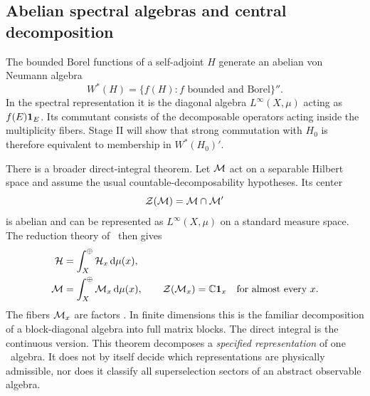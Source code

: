 \subsection{Abelian spectral algebras and central decomposition}
\label{subsec:central-decomposition}

The bounded Borel functions of a self-adjoint $H$ generate an abelian von
Neumann algebra
\begin{equation}
  W^*(H)=\{f(H):\text{$f$ bounded and Borel}\}'' .
  \label{eq:von-neumann-generated-H}
\end{equation}
In the spectral representation it is the diagonal algebra
$L^\infty(X,\mu)$ acting as $f(E)\mathbf{1}_E$.  Its commutant consists
of the decomposable operators acting inside the multiplicity fibers.  Stage II
will show that strong commutation with $H_0$ is therefore equivalent to
membership in $W^*(H_0)'$.

There is a broader direct-integral theorem.  Let $\mathcal{M}$ act on a separable
Hilbert space and assume the usual countable-decomposability hypotheses.  Its
center
\begin{equation}
  \mathcal{Z}(\mathcal{M})=\mathcal{M}\cap\mathcal{M}'
  \label{eq:center-von-neumann}
\end{equation}
is abelian and can be represented as $L^\infty(X,\mu)$ on a standard
measure space.  The reduction theory of \vN\ then gives
\begin{align}
  \mathcal{H}&=\int_X^\oplus\mathcal{H}_x\,\mathrm{d}\mu(x),
  \label{eq:central-H-decomposition}\\
  \mathcal{M}&=\int_X^\oplus\mathcal{M}_x\,\mathrm{d}\mu(x),
  \qquad
  \mathcal{Z}(\mathcal{M}_x)=\mathbb{C}\mathbf{1}_x
  \quad\text{for almost every $x$} .
  \label{eq:central-algebra-decomposition}
\end{align}
The fibers $\mathcal{M}_x$ are factors \cite{vonNeumann:1949Reduction,
Takesaki:2002}.  In finite dimensions this is the familiar decomposition of a
block-diagonal algebra into full matrix blocks.  The direct integral is the
continuous version.  This theorem decomposes a \textit{specified
representation} of one \vN\ algebra.  It does not by itself decide
which representations are physically admissible, nor does it classify all
superselection sectors of an abstract observable algebra.

